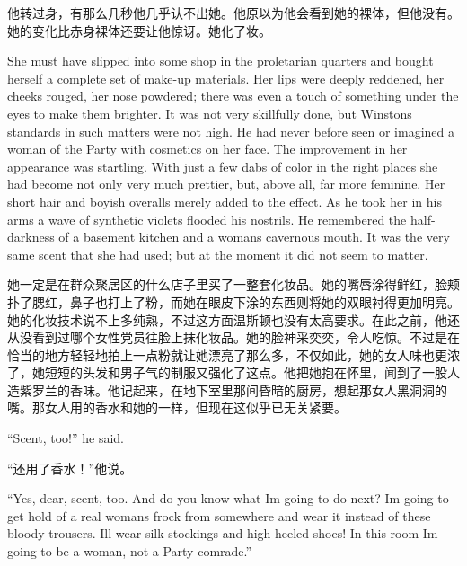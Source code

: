 \begin{paracol}{2}
\switchcolumn

他转过身，有那么几秒他几乎认不出她。他原以为他会看到她的裸体，但他没有。她的变化比赤身裸体还要让他惊讶。她化了妆。

\switchcolumn*

She must have slipped into some shop in the proletarian quarters and
bought herself a complete set of make-up materials. Her lips were deeply
reddened, her cheeks rouged, her nose powdered; there was even a touch
of something under the eyes to make them brighter. It was not very
skillfully done, but Winston\textquotesingle s standards in such matters
were not high. He had never before seen or imagined a woman of the Party
with cosmetics on her face. The improvement in her appearance was
startling. With just a few dabs of color in the right places she had
become not only very much prettier, but, above all, far more feminine.
Her short hair and boyish overalls merely added to the effect. As he
took her in his arms a wave of synthetic violets flooded his nostrils.
He remembered the half-darkness of a basement kitchen and a
woman\textquotesingle s cavernous mouth. It was the very same scent that
she had used; but at the moment it did not seem to matter.

\switchcolumn

她一定是在群众聚居区的什么店子里买了一整套化妆品。她的嘴唇涂得鲜红，脸颊扑了腮红，鼻子也打上了粉，而她在眼皮下涂的东西则将她的双眼衬得更加明亮。她的化妆技术说不上多纯熟，不过这方面温斯顿也没有太高要求。在此之前，他还从没看到过哪个女性党员往脸上抹化妆品。她的脸神采奕奕，令人吃惊。不过是在恰当的地方轻轻地拍上一点粉就让她漂亮了那么多，不仅如此，她的女人味也更浓了，她短短的头发和男子气的制服又强化了这点。他把她抱在怀里，闻到了一股人造紫罗兰的香味。他记起来，在地下室里那间昏暗的厨房，想起那女人黑洞洞的嘴。那女人用的香水和她的一样，但现在这似乎已无关紧要。

\switchcolumn*

``Scent, too!'' he said.

\switchcolumn

``还用了香水！''他说。

\switchcolumn*

``Yes, dear, scent, too. And do you know what I\textquotesingle m going
to do next? I\textquotesingle m going to get hold of a real
woman\textquotesingle s frock from somewhere and wear it instead of
these bloody trousers. I\textquotesingle ll wear silk stockings and
high-heeled shoes! In this room I\textquotesingle m going to be a woman,
not a Party comrade.''


\end{paracol}
